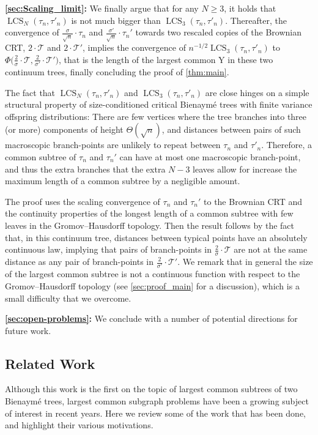 \documentclass[11pt,reqno]{amsart}
\newcommand{\1}{\mathbf{1}}
\newcommand{\0}{\mathbf{0}}
\newcommand{\sT}{\mathscr{T}}
\newcommand{\LCS}{\operatorname{LCS}}
\begin{document}
{\bf \cref{sec:Scaling_limit}:} We finally argue that for any $N\ge 3$, it holds that $\LCS_N(\tau_n, \tau'_n)$ is not much bigger than $\LCS_3(\tau_n, \tau'_n)$. Thereafter, the convergence of $\frac{\sigma}{\sqrt{n}}\cdot \tau_n$ and $\frac{\sigma'}{\sqrt{n}}\cdot \tau_n'$ towards two rescaled copies of the Brownian CRT, $2\cdot \sT$ and $2\cdot \sT'$, implies the convergence of $n^{-1/2}\LCS_3(\tau_n, \tau'_n)$ to $\Phi\big(\tfrac{2}{\sigma}\cdot\sT,\tfrac{2}{\sigma'}\cdot\sT'\big)$, that is the length of the largest common Y in these two continuum trees, finally concluding the proof of \cref{thm:main}.
\smallskip

The fact that $\LCS_N(\tau_n, \tau'_n)$ and $\LCS_3(\tau_n, \tau'_n)$ are close hinges on a simple structural property of size-conditioned critical Bienaym\'{e} trees with finite variance offspring distributions: There are few vertices where the tree branches into three (or more) components of height $\Theta(\sqrt{n})$, and distances between pairs of such macroscopic branch-points are unlikely to repeat between $\tau_n$ and $\tau'_n$. 
Therefore, a common subtree of $\tau_n$ and $\tau_n'$ can have at most one macroscopic branch-point, and thus the extra branches that the extra $N-3$ leaves allow for increase the maximum length of a common subtree by a negligible amount.
\smallskip

The proof uses the scaling convergence of $\tau_n$ and $\tau_n'$ to the Brownian CRT and the continuity properties of the longest length of a common subtree with few leaves in the Gromov--Hausdorff topology. Then the result follows by the fact that, in this continuum tree, distances between typical points have an absolutely continuous law, implying that pairs of branch-points in $\tfrac{2}{\sigma}\cdot \sT$ are not at the same distance as any pair of branch-points in $\tfrac{2}{\sigma'}\cdot \sT'$.
We remark that in general the size of the largest common subtree is not a continuous function with respect to the Gromov--Hausdorff topology (see \cref{sec:proof_main} for a discussion), which is a small difficulty that we overcome.


\medskip
{\bf \cref{sec:open-problems}:} We conclude with a number of potential directions for future work. 




\subsection{Related Work}


Although this work is the first on the topic of largest common subtrees of two Bienaym\'{e} trees, largest common subgraph problems have been a growing subject of interest in recent years. Here we review some of the work that has been done, and highlight their various motivations.
\smallskip
\end{document}
